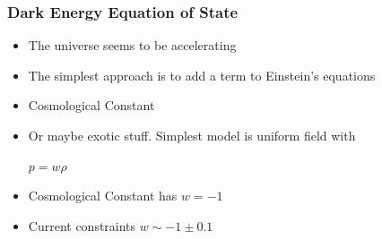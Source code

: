 \documentclass{beamer}
\begin{document}
\frame
{
    \frametitle{Dark Energy Equation of State}

 
    \begin{itemize}

        \item The universe seems to be accelerating

        \item The simplest approach is to add a term to Einstein's equations

        \item Cosmological Constant

        \item Or maybe exotic stuff.  Simplest model is uniform field with

       \vspace{5 mm}
        \begin{center}
            {\color{gold}
                {\huge $p = w \rho$}
            }
        \end{center}
       \vspace{5 mm}

        \item Cosmological Constant has $w=-1$

        \item Current constraints $w \sim -1 \pm 0.1$

    \end{itemize}

}
\end{document}
